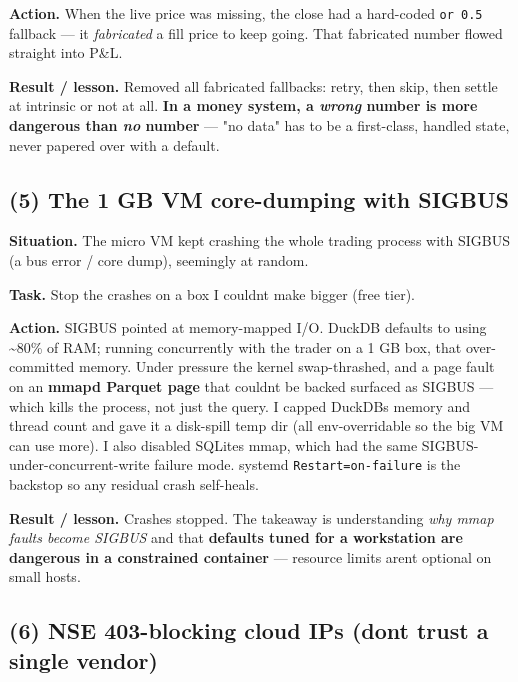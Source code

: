 \documentclass[11pt]{article}
\begin{document}
\textbf{Action.} When the live price was missing, the close had a hard-coded \texttt{or\ 0.5} fallback --- it
\emph{fabricated} a fill price to keep going. That fabricated number flowed straight into P\&L.

\textbf{Result / lesson.} Removed all fabricated fallbacks: retry, then skip, then settle at intrinsic
or not at all. \textbf{In a money system, a \emph{wrong} number is more dangerous than \emph{no} number} --- "no
data" has to be a first-class, handled state, never papered over with a default.

\subsection{(5) The 1 GB VM core-dumping with SIGBUS}\label{5-the-1-gb-vm-core-dumping-with-sigbus}

\textbf{Situation.} The micro VM kept crashing the whole trading process with SIGBUS (a bus error /
core dump), seemingly at random.

\textbf{Task.} Stop the crashes on a box I couldn\textquotesingle t make bigger (free tier).

\textbf{Action.} SIGBUS pointed at memory-mapped I/O. DuckDB defaults to using \textasciitilde80\% of RAM; running
concurrently with the trader on a 1 GB box, that over-committed memory. Under pressure the kernel
swap-thrashed, and a page fault on an \textbf{mmap\textquotesingle d Parquet page} that couldn\textquotesingle t be backed surfaced as
SIGBUS --- which kills the process, not just the query. I capped DuckDB\textquotesingle s memory and thread count
and gave it a disk-spill temp dir (all env-overridable so the big VM can use more). I also
disabled SQLite\textquotesingle s mmap, which had the same SIGBUS-under-concurrent-write failure mode. systemd
\texttt{Restart=on-failure} is the backstop so any residual crash self-heals.

\textbf{Result / lesson.} Crashes stopped. The takeaway is understanding \emph{why mmap faults become
SIGBUS} and that \textbf{defaults tuned for a workstation are dangerous in a constrained container} ---
resource limits aren\textquotesingle t optional on small hosts.

\subsection{(6) NSE 403-blocking cloud IPs (don\textquotesingle t trust a single vendor)}\label{6-nse-403-blocking-cloud-ips-dont-trust-a-single-vendor}
\end{document}
